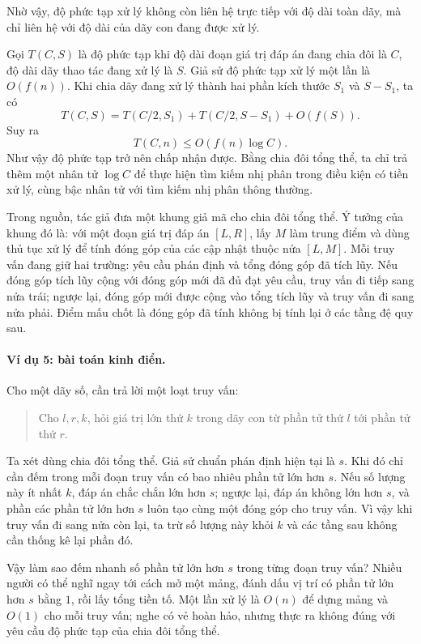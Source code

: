 \documentclass[11pt]{article}
\begin{document}
Nhờ vậy, độ phức tạp xử lý không còn liên hệ trực tiếp với độ dài toàn dãy,
mà chỉ liên hệ với độ dài của dãy con đang được xử lý.

Gọi \(T(C,S)\) là độ phức tạp khi độ dài đoạn giá trị đáp án đang chia đôi
là \(C\), độ dài dãy thao tác đang xử lý là \(S\). Giả sử độ phức tạp xử lý
một lần là \(O(f(n))\). Khi chia dãy đang xử lý thành hai phần kích thước
\(S_1\) và \(S-S_1\), ta có
\[
  T(C,S)=T(C/2,S_1)+T(C/2,S-S_1)+O(f(S)).
\]
Suy ra
\[
  T(C,n)\le O(f(n)\log C).
\]
Như vậy độ phức tạp trở nên chấp nhận được. Bằng chia đôi tổng thể, ta chỉ
trả thêm một nhân tử \(\log C\) để thực hiện tìm kiếm nhị phân trong điều
kiện có tiền xử lý, cùng bậc nhân tử với tìm kiếm nhị phân thông thường.

Trong nguồn, tác giả đưa một khung giả mã cho chia đôi tổng thể. Ý tưởng của
khung đó là: với một đoạn giá trị đáp án \([L,R]\), lấy \(M\) làm trung điểm
và dùng thủ tục xử lý để tính đóng góp của các cập nhật thuộc nửa
\([L,M]\). Mỗi truy vấn đang giữ hai trường: yêu cầu phán định và tổng đóng
góp đã tích lũy. Nếu đóng góp tích lũy cộng với đóng góp mới đã đủ đạt yêu
cầu, truy vấn đi tiếp sang nửa trái; ngược lại, đóng góp mới được cộng vào
tổng tích lũy và truy vấn đi sang nửa phải. Điểm mấu chốt là đóng góp đã
tính không bị tính lại ở các tầng đệ quy sau.

\paragraph{Ví dụ 5: bài toán kinh điển.}
Cho một dãy số, cần trả lời một loạt truy vấn:
\begin{quote}
Cho \(l,r,k\), hỏi giá trị lớn thứ \(k\) trong dãy con từ phần tử thứ \(l\)
tới phần tử thứ \(r\).
\end{quote}

Ta xét dùng chia đôi tổng thể. Giả sử chuẩn phán định hiện tại là \(s\). Khi
đó chỉ cần đếm trong mỗi đoạn truy vấn có bao nhiêu phần tử lớn hơn \(s\).
Nếu số lượng này ít nhất \(k\), đáp án chắc chắn lớn hơn \(s\); ngược lại,
đáp án không lớn hơn \(s\), và phần các phần tử lớn hơn \(s\) luôn tạo cùng
một đóng góp cho truy vấn. Vì vậy khi truy vấn đi sang nửa còn lại, ta trừ
số lượng này khỏi \(k\) và các tầng sau không cần thống kê lại phần đó.

Vậy làm sao đếm nhanh số phần tử lớn hơn \(s\) trong từng đoạn truy vấn?
Nhiều người có thể nghĩ ngay tới cách mở một mảng, đánh dấu vị trí có phần
tử lớn hơn \(s\) bằng \(1\), rồi lấy tổng tiền tố. Một lần xử lý là
\(O(n)\) để dựng mảng và \(O(1)\) cho mỗi truy vấn; nghe có vẻ hoàn hảo,
nhưng thực ra không đúng với yêu cầu độ phức tạp của chia đôi tổng thể.
\end{document}
